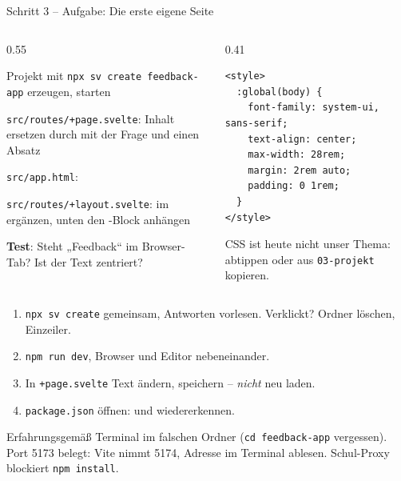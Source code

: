 \begin{frame}[fragile]{Schritt 3 -- Aufgabe: Die erste eigene Seite}
  \footnotesize
  \begin{columns}[onlytextwidth,t]
    \begin{column}{0.55\textwidth}
      \begin{tugenumerate}
        \item Projekt mit \texttt{npx sv create feedback-app} erzeugen, starten
        \item \texttt{src/routes/+page.svelte}: Inhalt ersetzen durch
               mit der Frage und einen Absatz
        \item \texttt{src/app.html}: 
        \item \texttt{src/routes/+layout.svelte}: im 
               ergänzen, unten den
              -Block anhängen
      \end{tugenumerate}
      \vspace{0.3em}
      \textbf{Test}: Steht „Feedback“ im Browser-Tab? Ist der Text zentriert?
    \end{column}
    \begin{column}{0.41\textwidth}
\begin{lstlisting}[style=sveltesm,numbers=none]
<style>
  :global(body) {
    font-family: system-ui, sans-serif;
    text-align: center;
    max-width: 28rem;
    margin: 2rem auto;
    padding: 0 1rem;
  }
</style>
\end{lstlisting}
      CSS ist heute nicht unser Thema: abtippen oder aus
      \texttt{03-projekt} kopieren.
    \end{column}
  \end{columns}
\end{frame}

\begin{lecturer}
\begin{frame}{}
  \footnotesize
  \begin{enumerate}
    \item \texttt{npx sv create} gemeinsam, Antworten vorlesen. Verklickt? Ordner löschen, Einzeiler.
    \item \texttt{npm run dev}, Browser und Editor nebeneinander.
    \item In \texttt{+page.svelte} Text ändern, speichern -- \emph{nicht} neu laden.
    \item \texttt{package.json} öffnen:  und  wiedererkennen.
  \end{enumerate}
  \begin{block}{Erfahrungsgemäß}
    Terminal im falschen Ordner (\texttt{cd feedback-app} vergessen). Port 5173 belegt:
    Vite nimmt 5174, Adresse im Terminal ablesen. Schul-Proxy blockiert \texttt{npm install}.
  \end{block}
\end{frame}
\end{lecturer}

